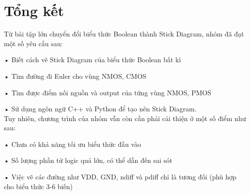 \documentclass[a4paper,12pt]{article}
\begin{document}
\section{Tổng kết}
Từ bài tập lớn chuyển đổi biểu thức Boolean thành Stick Diagram, nhóm đã đạt một số yêu cầu sau:

• Biết cách vẽ Stick Diagram của biểu thức Boolean bất kì

• Tìm đường đi Euler cho vùng NMOS, CMOS

• Tìm được điểm nối nguồn và output của từng vùng NMOS, PMOS

• Sử dụng ngôn ngữ C++ và Python để tạo nên Stick Diagram.\\
Tuy nhiên, chương trình của nhóm vẫn còn cần phải cải thiện ở một số điểm như sau: 

• Chưa có khả năng tối ưu biểu thức đầu vào

• Số lượng phần tử logic quá lớn, có thể dẫn đến sai sót

• Việc vẽ các đường như VDD, GND, ndiff và pdiff chỉ là tương đối (phù hợp cho biểu thức 3-6 biến)
\end{document}
